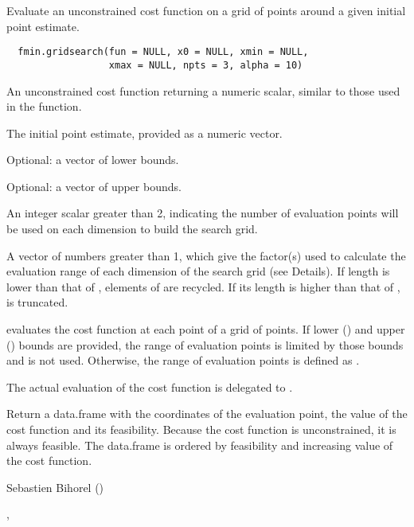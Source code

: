 %
\begin{Description}\relax
Evaluate an unconstrained cost function on a grid of points around a given 
initial point estimate.
\end{Description}
%
\begin{Usage}
\begin{verbatim}
  fmin.gridsearch(fun = NULL, x0 = NULL, xmin = NULL, 
                  xmax = NULL, npts = 3, alpha = 10)
\end{verbatim}
\end{Usage}
%
\begin{Arguments}
\begin{ldescription}
\item[\code{fun}] An unconstrained cost function returning a numeric scalar, similar 
to those used in the  function.
\item[\code{x0}] The initial point estimate, provided as a numeric vector.
\item[\code{xmin}] Optional: a vector of lower bounds.
\item[\code{xmax}] Optional: a vector of upper bounds.
\item[\code{npts}] An integer scalar greater than 2, indicating the number of 
evaluation points will be used on each dimension to build the search grid.
\item[\code{alpha}] A vector of numbers greater than 1, which give the factor(s) used
to calculate the evaluation range of each dimension of the search grid (see 
Details). If  length is lower than that of , elements 
of  are recycled. If its length is higher than that of 
,  is truncated.
\end{ldescription}
\end{Arguments}
%
\begin{Details}\relax
{} evaluates the cost function at each point 
of a grid of  points. If lower () and upper 
() bounds are provided, the range of evaluation points is limited 
by those bounds and  is not used. Otherwise, the range of 
evaluation points is defined as .

The actual evaluation of the cost function is delegated to 
.
\end{Details}
%
\begin{Value}
Return a data.frame with the coordinates of the evaluation point, the value of
the cost function and its feasibility. Because the cost function is 
unconstrained, it is always feasible. The data.frame is ordered by feasibility
and increasing value of the cost function.
\end{Value}
%
\begin{Author}\relax
Sebastien Bihorel ()
\end{Author}
%
\begin{SeeAlso}\relax
{}, 
\end{SeeAlso}

